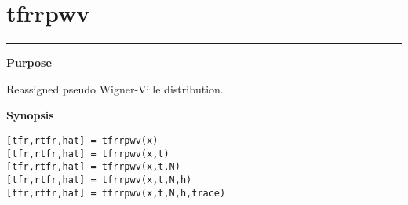 

\section*{\hspace*{-1.6cm} tfrrpwv}

\vspace*{-.4cm}
\hspace*{-1.6cm}\rule[0in]{16.5cm}{.02cm}
\vspace*{.2cm}

{\bf \large \sf Purpose}\\
\hspace*{1.5cm}
\begin{minipage}[t]{13.5cm}
Reassigned  pseudo Wigner-Ville distribution.
\end{minipage}
\vspace*{.5cm}

{\bf \large \sf Synopsis}\\
\hspace*{1.5cm}
\begin{minipage}[t]{13.5cm}
\begin{verbatim}
[tfr,rtfr,hat] = tfrrpwv(x) 
[tfr,rtfr,hat] = tfrrpwv(x,t) 
[tfr,rtfr,hat] = tfrrpwv(x,t,N) 
[tfr,rtfr,hat] = tfrrpwv(x,t,N,h) 
[tfr,rtfr,hat] = tfrrpwv(x,t,N,h,trace) 
\end{verbatim}
\end{minipage}
\vspace*{.35cm}

